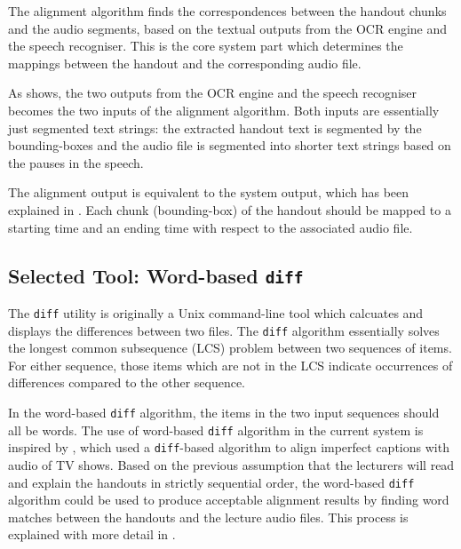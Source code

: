 The alignment algorithm finds the correspondences between the handout chunks and the audio segments, based on the textual outputs from the OCR engine and the speech recogniser. This is the core system part which determines the mappings between the handout and the corresponding audio file. 

As  shows, the two outputs from the OCR engine and the speech recogniser becomes the two inputs of the alignment algorithm. Both inputs are essentially just segmented text strings: the extracted handout text is segmented by the bounding-boxes and the audio file is segmented into shorter text strings based on the pauses in the speech.

The alignment output is equivalent to the system output, which has been explained in . Each chunk (bounding-box) of the handout should be mapped to a starting time and an ending time with respect to the associated audio file. 

\subsection{Selected Tool: Word-based \texttt{diff}}

The \texttt{diff} utility is originally a Unix command-line tool which calcuates and displays the differences between two files. The \texttt{diff} algorithm essentially solves the longest common subsequence (LCS) problem between two sequences of items. For either sequence, those items which are not in the LCS indicate occurrences of differences compared to the other sequence.

In the word-based \texttt{diff} algorithm, the items in the two input sequences should all be words. The use of word-based \texttt{diff} algorithm in the current system is inspired by \cite{lanchantin2015development}, which used a \texttt{diff}-based algorithm to align imperfect captions with audio of TV shows. Based on the previous assumption that the lecturers will read and explain the handouts in strictly sequential order, the word-based \texttt{diff} algorithm could be used to produce acceptable alignment results by finding word matches between the handouts and the lecture audio files. This process is explained with more detail in .






